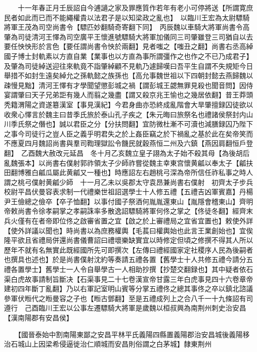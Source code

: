 　　十一年春正月壬辰詔自今逋讁之家及罪應質作若年有老小可停將送【所謂寛庶民者如此而已而不能繩權貴以法君子是以知梁政之亂也】　以臨川王宏為太尉驃騎將軍王茂為司空尚書令【驃匹妙翻騎奇寄翻下同】　丙辰魏以車騎大將軍尚書令高肇為司徒清河王懌為司空廣平王懷進號驃騎大將軍加儀同三司肇雖登三司猶自以去要任怏怏形於言色【要任謂尚書令怏於兩翻】見者嗤之【嗤丑之翻】尚書右丞高綽國子博士封軌素以方直自業【業事也以方直為事所謂彊作之也作之不已乃成君子】及肇為司徒綽送迎往來軌竟不詣肇綽顧不見軌乃遽歸嘆曰吾平生自謂不失規矩今日舉措不如封生遠矣綽允之孫軌懿之族孫也【高允事魏世祖以下四朝封懿去燕歸魏以疎慢見黜】清河王懌有才學聞望懲彭城之禍【謂彭城王勰無罪見殺也聞音問】因侍宴謂肇曰天子兄弟詎有幾人而翦之幾盡【謂又殺京兆王愉也之幾居依翻】昔王莽頭秃籍渭陽之資遂簒漢室【事見漢紀】今君身曲亦恐終成亂階會大旱肇擅録囚徒欲以收衆心懌言於魏主曰昔季氏旅於泰山孔子疾之【朱元晦曰旅祭名也禮諸侯祭封内山川季氏祭之僭也】誠以君臣之分【分扶問翻】宜防微杜漸不可瀆也減膳録囚乃陛下之事今司徒行之豈人臣之義乎明君失之於上姦臣竊之於下禍亂之基於此在矣帝笑而不應夏四月魏詔尚書與羣司鞫理獄訟令饑民就穀燕恒二州及六鎮【燕因肩翻恒戶登翻】　乙酉魏大赦改元延昌　冬十月乙亥魏立皇子詡為太子始不殺其母【為後胡后亂魏張本】以尚書右僕射郭祚領太子少師祚嘗從魏主幸東宫懷黄㼐以奉太子【㼐扶田翻博雅白㼐瓜屬此黄㼐又一種也】時應詔左右趙桃弓深為帝所信任祚私事之時人謂之桃弓僕射黄㼐少師　十一月乙未以吳郡太守袁昂兼尚書右僕射　初齊太子步兵校尉平昌伏曼容表求制一代禮樂世祖詔選學士十人修五禮【五禮吉凶軍賓嘉】丹楊尹王儉總之儉卒【卒子恤翻】以事付國子祭酒何胤胤還東山【胤隱會稽東山】齊明帝敕尚書令徐孝嗣掌之孝嗣誅率多散逸詔驃騎將軍何佟之掌之【佟徒冬翻】經齊末兵火僅有在者帝即位佟之啟審省置之宜【啟之於上審禮局之宜省宜置也】敕使外詳【使外詳議以聞也】時尚書以為庶務權輿【毛萇曰權輿始也此言王業創始也】宜俟隆平欲且省禮局併還尚書儀曹詔曰禮壞樂缺實宜以時修定但頃之修撰不得其人所以歷年不就有名無實此既經國所先可即撰次【左傳曰禮經國家定社稷序人民為後嗣者也撰具也述也】於是尚書僕射沈約等奏請五禮各置【舊學士十人共修五禮今請分五禮各置學士】舊學士一人令自舉學古一人相助抄撰【抄楚交翻録也】其中疑者依石渠白虎故事請制旨斷决【石渠事見二十七卷漢宣帝甘露三年白虎事見四十六卷章帝建初四年斷丁亂翻】乃以右軍記室明山賓等分掌五禮佟之總其事佟之卒以鎮北諮議參軍伏暅代之暅曼容之子也【暅古鄧翻】至是五禮成列上之合八千一十九條詔有司遵行　己酉臨川王宏以公事左遷驃騎大將軍是歲魏以桓叔興為南荆州刺史治安昌【漢南陽郡有安昌侯】

　　【國晉泰始中割南陽東鄙之安昌平林平氏義陽四縣置義陽郡治安昌城後義陽移治石城山上因梁希侵逼徙治仁順城而安昌則俗謂之白茅城】隸東荆州

